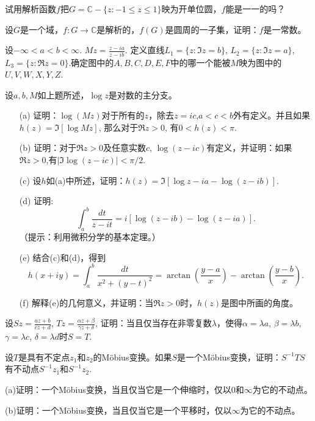 \begin{problemset}
\item 试用解析函数$f$把$G = \mathbb{C} - \{z:-1  \le z \le 1\}$映为开单位圆，$f$能是一一的吗？

\item 设$G$是一个域，$f: G \to \mathbb{C}$是解析的，$f(G)$是圆周的一子集，证明：$f$是一常数。

\item 设$-\infty < a < b < \infty$. $Mz = \frac{z-ia}{z-ib}$. 定义直线$L_1 = \{z:\Im{z}=b\}$, $L_2 = \{z:\Im{z}=a\}$, $L_3=\{z:\Re{z}=0\}$.确定图中的$A, B, C, D, E, F$中的哪一个能被$M$映为图中的$U,V,W,X,Y,Z$.

\item 设$a,b,M$如上题所述，$\log{z}$是对数的主分支。
\begin{enumerate}
\item[(a)]证明：$\log{(Mz)}$对于所有的$z$，除去$z=ic$,$a<c<b$外有定义。并且如果$h(z)=\Im{[\log{Mz}]}$, 那么对于$\Re{z} > 0$, 有$0 < h(z) < \pi$.
\item[(b)]证明：对于$\Re{z} > 0$及任意实数$c$, $\log{(z-ic)}$有定义，并证明：如果$\Re{z}>0$,有$|\Im{\log{(z-ic)}}|<\pi/2$. 
\item[(c)]设$h$如(a)中所述，证明：$h(z)=\Im{[\log{z-ia} - \log{(z-ib)}]}$.
\item[(d)]证明:
\[
\int_{a}^{b}{\frac{dt}{z-it}} = i[\log{(z-ib)} - \log{(z-ia)}].
\]
（提示：利用微积分学的基本定理。）
\item[(e)]结合(c)和(d)，得到
\[
h(x+iy) = \int_{a}^{b}{\frac{dt}{x^2 + (y-t)^2}} = \arctan{(\frac{y-a}{x})} - \arctan{(\frac{y-b}{x})}.
\]
\item[(f)]解释(e)的几何意义，并证明：当$\Re{z}>0$时，$h(z)$是图中所画的角度。
\end{enumerate}

\item\label{exer002030320}设$Sz = \frac{az+b}{cz+d}$, $Tz = \frac{\alpha{}z + \beta}{\gamma{}z + \delta}$, 证明：当且仅当存在非零复数$\lambda$，使得$\alpha = \lambda{}a$, $\beta = \lambda{}b$, $\gamma = \lambda{}c$, $\delta = \lambda{}d$时$S = T$.

\item\label{exer002030321} 设$T$是具有不定点$z_1$和$z_2$的M\"obius变换。如果$S$是一个M\"obius变换，证明：$S^{-1}TS$有不动点$S^{-1}z_1$和$S^{-1}z_2$.

\item\label{exer002030322} (a)证明：一个M\"obius变换，当且仅当它是一个伸缩时，仅以$0$和$\infty$为它的不动点。

(b)证明：一个M\"obius变换，当且仅当它是一个平移时，仅以$\infty$为它的不动点。


\end{problemset}
